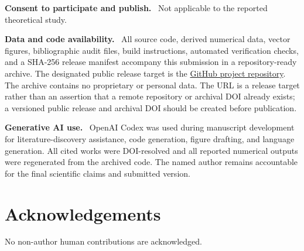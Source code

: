 \documentclass[10pt,a4paper]{article}
\newcommand{\inlinehead}[1]{\par\smallskip\noindent\textbf{#1}\ }
\begin{document}
\inlinehead{Consent to participate and publish.} Not applicable to the reported theoretical study.

\inlinehead{Data and code availability.} All source code, derived numerical data, vector figures, bibliographic audit files, build instructions, automated verification checks, and a SHA-256 release manifest accompany this submission in a repository-ready archive. The designated public release target is the \href{https://github.com/sdagnano/algorithmically-mediated-social-hysteresis}{GitHub project repository}. The archive contains no proprietary or personal data. The URL is a release target rather than an assertion that a remote repository or archival DOI already exists; a versioned public release and archival DOI should be created before publication.

\inlinehead{Generative AI use.} OpenAI Codex was used during manuscript development for literature-discovery assistance, code generation, figure drafting, and language generation. All cited works were DOI-resolved and all reported numerical outputs were regenerated from the archived code. The named author remains accountable for the final scientific claims and submitted version.

\section*{Acknowledgements} No non-author human contributions are acknowledged.
\end{document}
